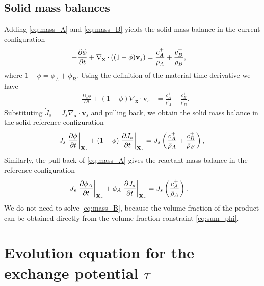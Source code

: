 \documentclass[11pt]{article}
\begin{document}
\subsection{Solid mass balances}
%
Adding \eqref{eq:mass_A} and \eqref{eq:mass_B} yields the solid mass balance in the current configuration
%
\begin{align}
  -\frac{\partial \phi }{\partial t} + \nabla_{\mathbf{x}} \cdot \left((1 - \phi)  \mathbf{v}_s\right) &= \frac{c^{+}_A}{\bar\rho_A} + \frac{c^{+}_B}{\bar\rho_B}, \notag
\end{align}
where $ 1 - \phi= \phi_A + \phi_B $.
%
Using the definition of the material time derivative we have
%
\begin{align*}
  -\frac{D_s \phi }{D t} + (1 - \phi) \nabla_{\mathbf{x}} \cdot   \mathbf{v}_s &= \frac{c^{+}_A}{\bar\rho_A} + \frac{c^{+}_B}{\bar\rho_B}.
\end{align*}
%
Substituting $\dot{J}_s = J_s \nabla_{\mathbf{x}} \cdot \mathbf{v}_s$ and pulling back, we obtain the solid mass balance in the solid reference configuration
%
\begin{align}
  -J_s\left.\frac{\partial \phi }{\partial t}\right\vert_{\mathbf{X}_s} + (1 - \phi) \left.\frac{\partial J_s}{\partial t}\right\vert_{\mathbf{X}_s} &= J_s \left(\frac{c^{+}_A}{\bar\rho_A} + \frac{c^{+}_B}{\bar\rho_B} \right) \label{eqn:phi_evolve},
\end{align}
%
Similarly, the pull-back of \eqref{eq:mass_A} gives the reactant mass balance in the reference configuration
%
\begin{align}
  J_s \left.\frac{\partial \phi_A }{\partial t}\right\vert_{\mathbf{X}_s} + \phi_A \left.\frac{\partial J_s}{\partial t}\right\vert_{\mathbf{X}_s} &= J_s \left(\frac{c^{+}_A}{\bar\rho_A} \right). \label{eqn:phiA_evovle}
\end{align}
%
We do not need to solve \eqref{eq:mass_B}, because the volume fraction of the product can be obtained directly from the volume fraction constraint \eqref{eq:sum_phi}.

\section{Evolution equation for the exchange potential \texorpdfstring{$\tau$}{tau}}
\end{document}
